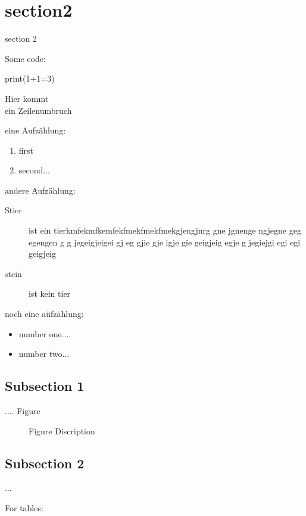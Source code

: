 \documentclass[german,version-2020-11]{uzl-thesis}
\begin{document}
\section{section2}
section 2


Some code:
\begin{Code}
print(1+1=3)
\end{Code}

Hier kommt \\ ein Zeilenumbruch

   eine Aufzählung:

   \begin{enumerate}
   \item 
     first
   \item
     second...
   \end{enumerate}
   
   andere Aufzählung:
   
   \begin{description}
   \item[Stier] 
     ist ein tierkmfekmfkemfekfmekfmekfmekgjengjnrg gne jgnenge ngjegne geg egengen g g jegeigjeigei gj eg gjie gje igje gie geigjeig  egje g jegiejgi egi egi geigjeig
   \item[stein]
     ist kein tier
   \end{description}
   
   noch eine aüfzählung:
   
   \begin{itemize}
     \item number one....
     \item
       number two...
     \end{itemize}
   
   
   \subsection{Subsection 1}
   ....
   Figure
   
   \begin{figure}[htbp]
     \centering
     \textcolor{black!10}{\vrule width3cm height 3cm}
     \caption{Figure Discription}
     \label{fig-ode1}
   
   \end{figure}
   
   
   \subsection{Subsection 2}
   ...
   
   For tables:
   
\end{document}
